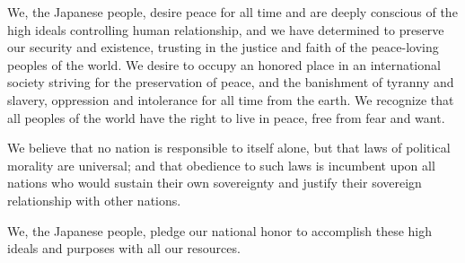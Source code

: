 \documentclass[twocolumn]{jsarticle}
\begin{document}
We, the Japanese people, desire peace for all time and are deeply conscious of the high ideals controlling human relationship, and we have determined to preserve our security and existence, trusting in the justice and faith of the peace-loving peoples of the world. We desire to occupy an honored place in an international society striving for the preservation of peace, and the banishment of tyranny and slavery, oppression and intolerance for all time from the earth. We recognize that all peoples of the world have the right to live in peace, free from fear and want.

We believe that no nation is responsible to itself alone, but that laws of political morality are universal; and that obedience to such laws is incumbent upon all nations who would sustain their own sovereignty and justify their sovereign relationship with other nations.

We, the Japanese people, pledge our national honor to accomplish these high ideals and purposes with all our resources.
\end{document}
